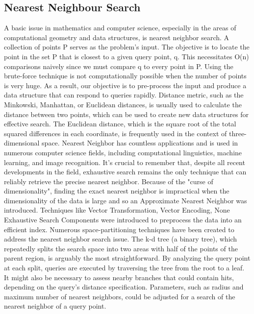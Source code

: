 \subsection{Nearest Neighbour Search}
A basic issue in mathematics and computer science, especially in the areas of computational geometry and data structures, is nearest neighbor search. A collection of points P serves as the problem's input. The objective is to locate the point in the set P that is closest to a given query point, q. This necessitates O(n) comparisons naively since we must compare q to every point in P. Using the brute-force technique is not computationally possible when the number of points is very huge. As a result, our objective is to pre-process the input and produce a data structure that can respond to queries rapidly. Distance metric, such as the Minkowski, Manhattan, or Euclidean distances, is usually used to calculate the distance between two points, which can be used to create new data structures for effective search. The Euclidean distance, which is the square root of the total squared differences in each coordinate, is frequently used in the context of three-dimensional space. Nearest Neighbor has countless applications and is used in numerous computer science fields, including computational linguistics, machine learning, and image recognition. It's crucial to remember that, despite all recent developments in the field, exhaustive search remains the only technique that can reliably retrieve the precise nearest neighbor. Because of the "curse of dimensionality", finding the exact nearest neighbor is impractical when the dimensionality of the data is large and so an Approximate Nearest Neighbor was introduced. Techniques like Vector Transformation, Vector Encoding, None Exhaustive Search Components were introduced to preprocess the data into an efficient index. Numerous space-partitioning techniques have been created to address the nearest neighbor search issue. The k-d tree (a binary tree), which repeatedly splits the search space into two areas with half of the points of the parent region, is arguably the most straightforward. By analyzing the query point at each split, queries are executed by traversing the tree from the root to a leaf. It might also be necessary to assess nearby branches that could contain hits, depending on the query's distance specification. Parameters, such as radius and maximum number of nearest neighbors, could be adjusted for a search of the nearest neighbor of a query point.
